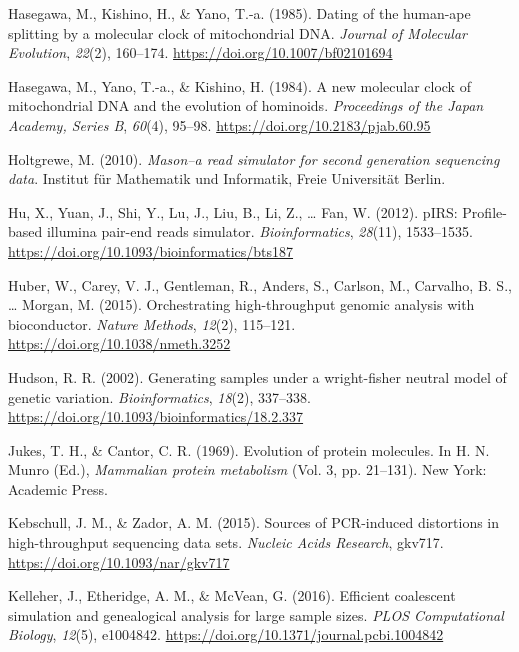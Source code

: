\documentclass[12pt,]{article}
\begin{document}
\leavevmode\hypertarget{ref-Hasegawa_1985}{}%
Hasegawa, M., Kishino, H., \& Yano, T.-a. (1985). Dating of the
human-ape splitting by a molecular clock of mitochondrial DNA.
\emph{Journal of Molecular Evolution}, \emph{22}(2), 160--174.
\url{https://doi.org/10.1007/bf02101694}

\leavevmode\hypertarget{ref-Hasegawa_1984}{}%
Hasegawa, M., Yano, T.-a., \& Kishino, H. (1984). A new molecular clock
of mitochondrial DNA and the evolution of hominoids. \emph{Proceedings
of the Japan Academy, Series B}, \emph{60}(4), 95--98.
\url{https://doi.org/10.2183/pjab.60.95}

\leavevmode\hypertarget{ref-Mason}{}%
Holtgrewe, M. (2010). \emph{Mason--a read simulator for second
generation sequencing data}. Institut für Mathematik und Informatik,
Freie Universität Berlin.

\leavevmode\hypertarget{ref-Hu_2012}{}%
Hu, X., Yuan, J., Shi, Y., Lu, J., Liu, B., Li, Z., \ldots{} Fan, W.
(2012). pIRS: Profile-based illumina pair-end reads simulator.
\emph{Bioinformatics}, \emph{28}(11), 1533--1535.
\url{https://doi.org/10.1093/bioinformatics/bts187}

\leavevmode\hypertarget{ref-Huber_2015}{}%
Huber, W., Carey, V. J., Gentleman, R., Anders, S., Carlson, M.,
Carvalho, B. S., \ldots{} Morgan, M. (2015). Orchestrating
high-throughput genomic analysis with bioconductor. \emph{Nature
Methods}, \emph{12}(2), 115--121.
\url{https://doi.org/10.1038/nmeth.3252}

\leavevmode\hypertarget{ref-Hudson_2002}{}%
Hudson, R. R. (2002). Generating samples under a wright-fisher neutral
model of genetic variation. \emph{Bioinformatics}, \emph{18}(2),
337--338. \url{https://doi.org/10.1093/bioinformatics/18.2.337}

\leavevmode\hypertarget{ref-JC69}{}%
Jukes, T. H., \& Cantor, C. R. (1969). Evolution of protein molecules.
In H. N. Munro (Ed.), \emph{Mammalian protein metabolism} (Vol. 3, pp.
21--131). New York: Academic Press.

\leavevmode\hypertarget{ref-Kebschull_2015}{}%
Kebschull, J. M., \& Zador, A. M. (2015). Sources of PCR-induced
distortions in high-throughput sequencing data sets. \emph{Nucleic Acids
Research}, gkv717. \url{https://doi.org/10.1093/nar/gkv717}

\leavevmode\hypertarget{ref-Kelleher_2016}{}%
Kelleher, J., Etheridge, A. M., \& McVean, G. (2016). Efficient
coalescent simulation and genealogical analysis for large sample sizes.
\emph{PLOS Computational Biology}, \emph{12}(5), e1004842.
\url{https://doi.org/10.1371/journal.pcbi.1004842}
\end{document}

